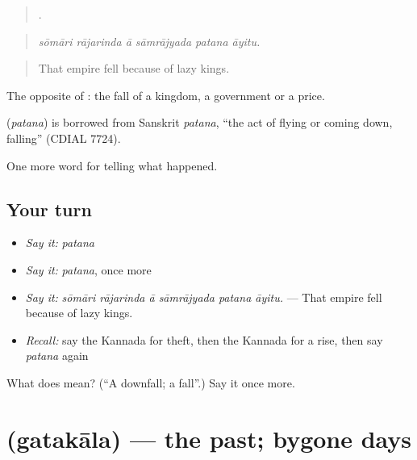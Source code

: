 \begin{quote}
     .
\end{quote}

\begin{quote}
\emph{sōmāri rājarinda ā sāmrājyada patana āyitu.}
\end{quote}

\begin{quote}
That empire fell because of lazy kings.
\end{quote}

The opposite of : the fall of a kingdom, a government or a price.

\begin{cousinweb}
\textbf{} (\emph{patana}) is borrowed from Sanskrit \emph{patana}, \textquotedblleft{}the act of flying or coming down, falling\textquotedblright{} (CDIAL 7724).
\end{cousinweb}

\begin{grammarlens}[title={What you've built}]
One more word for telling what happened.
\end{grammarlens}

\subsection*{Your turn}
\begin{itemize}
\raggedright
  \item \emph{Say it:} \emph{patana}
  \item \emph{Say it:} \emph{patana}, once more
  \item \emph{Say it:} \emph{sōmāri rājarinda ā sāmrājyada patana āyitu.} — That empire fell because of lazy kings.
  \item \emph{Recall:} say the Kannada for theft, then the Kannada for a rise, then say \emph{patana} again
\end{itemize}

\begin{tcolorbox}[breakable,colback=teal!4,colframe=teal!35!black,title={Before you move on}]
What does  mean? (\textquotedblleft{}A downfall; a fall\textquotedblright{}.) Say it once more.
\end{tcolorbox}
\section[\texorpdfstring{\kn{ಗತಕಾಲ} (gatakāla)}{ಗತಕಾಲ (gatakāla)}]{ (gatakāla) — the past; bygone days}

